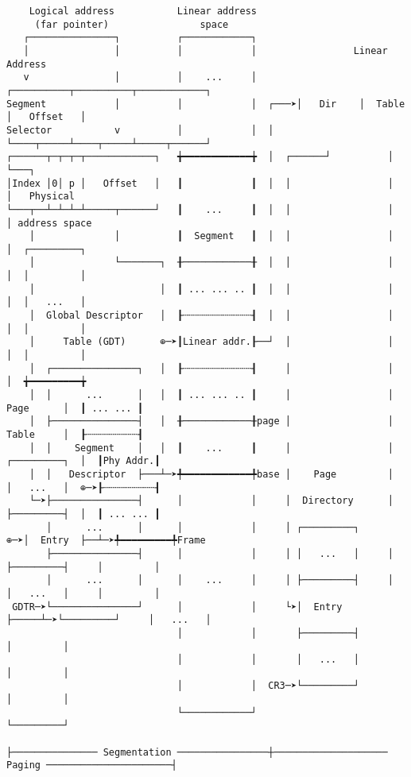 \documentclass[varwidth=30cm]{standalone}
\begin{document}
\begin{verbatim}
    Logical address           Linear address
     (far pointer)                space
   ┌───────────────┐          ┌────────────┐
   │               │          │            │                 Linear Address
   v               │          │    ...     │       ┌──────────┬──────────┬────────────┐
Segment            │          │            │  ┌───➤│   Dir    │  Table   │   Offset   │
Selector           v          │            │  │    └────┬─────┴────┬─────┴─────┬──────┘
┌──────┬─┬─┬─┬────────────┐   ╈━━━━━━━━━━━━╈  │  ┌──────┘          │           └───┐
│Index │0│ p │   Offset   │   ┃            ┃  │  │                 │               │   Physical
└───┬──┴─┴─┴─┴─────┬──────┘   ┃    ...     ┃  │  │                 │               │ address space
    │              │          ┃  Segment   ┃  │  │                 │               │  ┌─────────┐
    │              └───────┐  ╂────────────╂  │  │                 │               │  │         │
    │                      │  ┃ ... ... .. ┃  │  │                 │               │  │   ...   │
    │  Global Descriptor   │  ┠┄┄┄┄┄┄┄┄┄┄┄┄┨  │  │                 │               │  │         │
    │     Table (GDT)      ⊕─➤┃Linear addr.┠──┘  │                 │               │  │         │
    │  ┌───────────────┐   │  ┠┄┄┄┄┄┄┄┄┄┄┄┄┨     │                 │               │  ╈━━━━━━━━━╈
    │  │      ...      │   │  ┃ ... ... .. ┃     │                 │     Page      │  ┃ ... ... ┃
    │  ├───────────────┤   │  ╂────────────╂page │                 │     Table     │  ┠┄┄┄┄┄┄┄┄┄┨
    │  │    Segment    │   │  ┃    ...     ┃     │                 │  ┌─────────┐  │  ┃Phy Addr.┃
    │  │   Descriptor  ├───┴─➤╇━━━━━━━━━━━━╇base │    Page         │  │   ...   │  ⊕─➤┠┄┄┄┄┄┄┄┄┄┨
    └─➤├───────────────┤      │            │     │  Directory      │  ├─────────┤  │  ┃ ... ... ┃
       │      ...      │      │            │     │ ┌─────────┐     ⊕─➤│  Entry  ├──┴─➤╇━━━━━━━━━╇Frame
       ├───────────────┤      │            │     │ │   ...   │     │  ├─────────┤     │         │
       │      ...      │      │    ...     │     │ ├─────────┤     │  │   ...   │     │         │
 GDTR─➤└───────────────┘      │            │     └➤│  Entry  ├─────┴─➤└─────────┘     │   ...   │
                              │            │       ├─────────┤                        │         │
                              │            │       │   ...   │                        │         │
                              │            │  CR3─➤└─────────┘                        │         │
                              └────────────┘                                          └─────────┘

├─────────────── Segmentation ────────────────┼──────────────────── Paging ──────────────────────┤
\end{verbatim}
\end{document}
